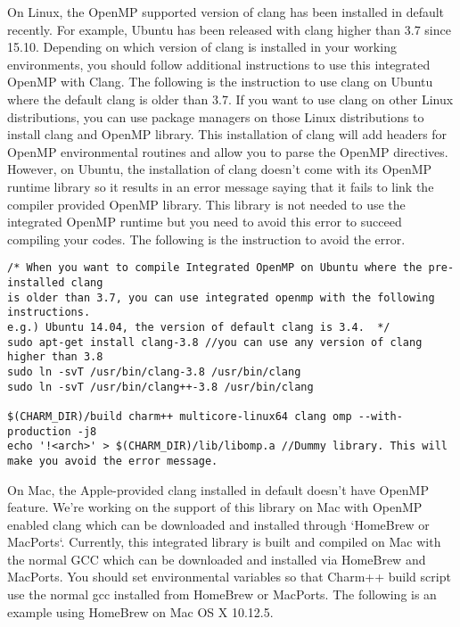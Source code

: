 On Linux, the OpenMP supported version of clang has been installed in default recently. For example, 
Ubuntu has been released with clang higher than 3.7 since 15.10.
Depending on which version of clang is installed in your working environments, you should follow additional instructions
to use this integrated OpenMP with Clang. The following is the instruction to use 
clang on Ubuntu where the default clang is older than 3.7. If you want to use clang on other Linux 
distributions, you can use package managers on those Linux distributions to install clang and OpenMP library. 
This installation of clang will add headers for OpenMP environmental routines and allow you to parse the OpenMP directives.
However, on Ubuntu, the installation of clang doesn't come with its OpenMP runtime library so it results in an error message saying that
it fails to link the compiler provided OpenMP library. This library is not needed to use the integrated OpenMP runtime but you
need to avoid this error to succeed compiling your codes. The following is the instruction to avoid the error. 

\begin{verbatim}
/* When you want to compile Integrated OpenMP on Ubuntu where the pre-installed clang
is older than 3.7, you can use integrated openmp with the following instructions.
e.g.) Ubuntu 14.04, the version of default clang is 3.4.  */
sudo apt-get install clang-3.8 //you can use any version of clang higher than 3.8
sudo ln -svT /usr/bin/clang-3.8 /usr/bin/clang
sudo ln -svT /usr/bin/clang++-3.8 /usr/bin/clang

$(CHARM_DIR)/build charm++ multicore-linux64 clang omp --with-production -j8 
echo '!<arch>' > $(CHARM_DIR)/lib/libomp.a //Dummy library. This will make you avoid the error message.
\end{verbatim}

On Mac, the Apple-provided clang installed in default doesn't have OpenMP feature. We're working on the support of 
this library on Mac with OpenMP enabled clang which can be downloaded and installed through `HomeBrew or MacPorts`.
Currently, this integrated library is built and compiled on Mac with the normal GCC which can be downloaded and 
installed via HomeBrew and MacPorts. You should set environmental variables so that Charm++ build script use the
normal gcc installed from HomeBrew or MacPorts. The following is an example using HomeBrew on Mac OS X 10.12.5.

